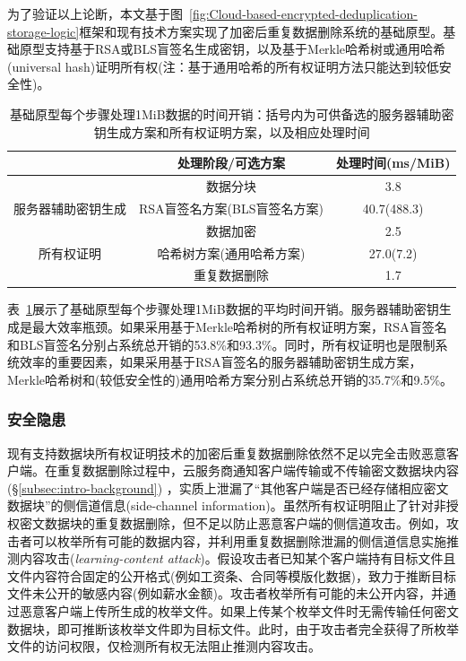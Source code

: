 为了验证以上论断，本文基于图~\ref{fig:Cloud-based-encrypted-deduplication-storage-logic}框架和现有技术方案实现了加密后重复数据删除系统的基础原型。基础原型支持基于RSA\cite{bellare2013DupLESS}或BLS\cite{armknecht2015transparent}盲签名生成密钥，以及基于Merkle哈希树\cite{halevi2011proofs}或通用哈希(universal hash)\cite{xu2013weak}证明所有权(注：基于通用哈希的所有权证明方法\cite{xu2013weak}只能达到较低安全性)。

\begin{table}[!htb]
    \small
    \centering
    \begin{tabular}{@{}ccc@{}}
    \toprule
                           & 处理阶段/可选方案          & 处理时间(ms/MiB) \\ \midrule
                           & 数据分块               & 3.8          \\
    服务器辅助密钥生成              & RSA盲签名方案(BLS盲签名方案) & 40.7(488.3)  \\
    \multirow{3}{*}{所有权证明} & 数据加密               & 2.5          \\
                           & 哈希树方案(通用哈希方案)      & 27.0(7.2)    \\
                           & 重复数据删除             & 1.7          \\ \bottomrule
    \end{tabular}
    \caption{基础原型每个步骤处理1MiB数据的时间开销：括号内为可供备选的服务器辅助密钥生成方案和所有权证明方案，以及相应处理时间}
    \label{tab:intro-bottleneck}
\end{table}

表~\ref{tab:intro-bottleneck}展示了基础原型每个步骤处理1MiB数据的平均时间开销。服务器辅助密钥生成是最大效率瓶颈。如果采用基于Merkle哈希树的所有权证明方案，RSA盲签名和BLS盲签名分别占系统总开销的53.8\%和93.3\%。同时，所有权证明也是限制系统效率的重要因素，如果采用基于RSA盲签名的服务器辅助密钥生成方案，Merkle哈希树和(较低安全性的)通用哈希方案分别占系统总开销的35.7\%和9.5\%。

\subsubsection{安全隐患} 
\label{subsubsec:intro-problem-security}

现有支持数据块所有权证明技术的加密后重复数据删除依然不足以完全击败恶意客户端。在重复数据删除过程中，云服务商通知客户端传输或不传输密文数据块内容(\S\ref{subsec:intro-background}) ，实质上泄漏了“其他客户端是否已经存储相应密文数据块”的侧信道信息(side-channel information)。虽然所有权证明阻止了针对非授权密文数据块的重复数据删除，但不足以防止恶意客户端的侧信道攻击。例如，攻击者可以枚举所有可能的数据内容，并利用重复数据删除泄漏的侧信道信息实施推测内容攻击({\em learning-content attack})\cite{harnik2010side,zuo2018mitigating}。假设攻击者已知某个客户端持有目标文件且文件内容符合固定的公开格式(例如工资条、合同等模版化数据)，致力于推断目标文件未公开的敏感内容(例如薪水金额)。攻击者枚举所有可能的未公开内容，并通过恶意客户端上传所生成的枚举文件。如果上传某个枚举文件时无需传输任何密文数据块，即可推断该枚举文件即为目标文件。此时，由于攻击者完全获得了所枚举文件的访问权限，仅检测所有权无法阻止推测内容攻击。

